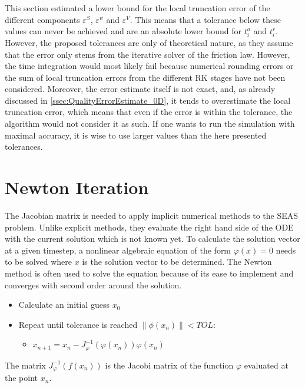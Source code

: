 This section estimated a lower bound for the local truncation error of the different components $\varepsilon^S$, $\varepsilon^\psi$ and $\varepsilon^V$. This means that a tolerance below these values can never be achieved and are an absolute lower bound for $t_i^a$ and $t_i^r$. \\

However, the proposed tolerances are only of theoretical nature, as they assume that the error only stems from the iterative solver of the friction law. However, the time integration would most likely fail because numerical rounding errors or the sum of local truncation errors from the different RK stages have not been considered. Moreover, the error estimate itself is not exact, and, as already discussed in \autoref{ssec:QualityErrorEstimate_0D}, it tends to overestimate the local truncation error, which means that even if the error is within the tolerance, the algorithm would not consider it as such. If one wants to run the simulation with maximal accuracy, it is wise to use larger values than the here presented tolerances.


\section{Newton Iteration}
\label{ssec:ConvergenceNewtonIteration}
The Jacobian matrix is needed to apply implicit numerical methods to the SEAS problem. Unlike explicit methods, they evaluate the right hand side of the ODE with the current solution which is not known yet. To calculate the solution vector at a given timestep, a nonlinear algebraic equation of the form $\varphi(x) = 0$ needs to be solved where $x$ is the solution vector to be determined. The Newton method is often used to solve the equation because of its ease to implement and converges with second order around the solution. 

\begin{itemize}
	\item Calculate an initial guess $x_0$
	\item Repeat until tolerance is reached $\|\phi(x_n)\| < TOL$: 
	\begin{itemize}
		\item $x_{n+1} = x_n - J_\varphi^{-1}(\varphi(x_n)) \varphi(x_n)$
	\end{itemize} 
\end{itemize}

The matrix $J_\varphi^{-1}(f(x_n))$ is the Jacobi matrix of the function $\varphi$ evaluated at the point $x_n$. \\

